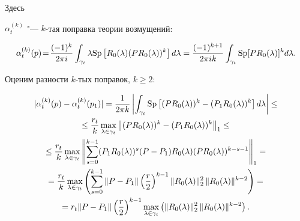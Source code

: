 Здесь

$\alpha_t^{(k)}$ "--- $k$-тая поправка теории возмущений: 

$$

\alpha_t^{(k)}(p)\!=\!\frac{(-1)^k}{2\pi

i}\int_{\gamma_t}\lambda{\rm

Sp}\left[R_0(\lambda)(PR_0(\lambda))^k\right]d\lambda=

\frac{(-1)^{k+1}}{2\pi i k }\int_{\gamma_t}{\rm

Sp}[PR_0(\lambda)]^kd\lambda. $$





Оценим разности $k$-тых поправок,  $k\ge2$: 

\begin{multline*}

|\alpha_t^{(k)}(p)-\alpha_t^{(k)}(p_1)|=\frac1{2\pi k

}\left|\int_{\gamma_t} {\rm

Sp}\left[(PR_0(\lambda))^k-(P_1R_0(\lambda))^k\right]d\lambda\right|\le

\\ 

\le 

\frac{r_t}{k}\max_{\lambda\in\gamma_t}

\left\|(PR_0(\lambda))^k-(P_1R_0(\lambda))^k\right\|_1\le 

\\

\le 

\frac{r_t}{k}\max_{\lambda\in\gamma_t}

\left\|\sum_{s=0}^{k-1}(P_{1}R_{0}(\lambda))^{s}(P-P_{1})R_{0}(\lambda)

(PR_{0}(\lambda))^{k-s-1}\right\|_1= 

\\

=

\frac{r_t}{k}\max_{\lambda\in\gamma_t}

\left(\sum_{s=0}^{k-1}\|P-P_1\|\left(\frac{r}{2}\right)^{k-1}\|R_0(\lambda)\|_2^2\, \|R_0(\lambda)\|^{k-2}\right)=

\\

=

r_t\|P-P_1\|\left(\frac{r}{2}\right)^{k-1}

\max_{\lambda\in\gamma_t}\left(\|R_0(\lambda)\|_2^2\, \|R_0(\lambda)\|^{k-2}\right).

\end{multline*} 


